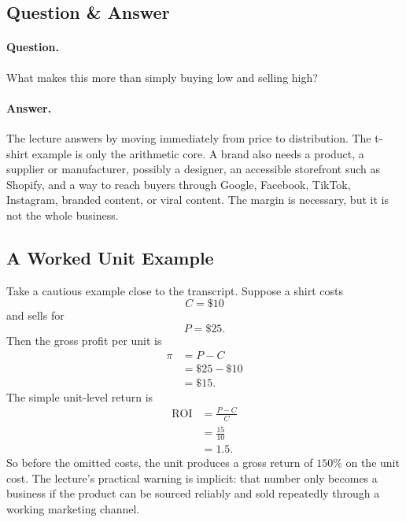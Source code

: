 \subsection{Question \& Answer}

\paragraph{Question.}
What makes this more than simply buying low and selling high?

\paragraph{Answer.}
The lecture answers by moving immediately from price to distribution. The t-shirt example is only the arithmetic core. A brand also needs a product, a supplier or manufacturer, possibly a designer, an accessible storefront such as Shopify, and a way to reach buyers through Google, Facebook, TikTok, Instagram, branded content, or viral content. The margin is necessary, but it is not the whole business.

\subsection{A Worked Unit Example}

Take a cautious example close to the transcript. Suppose a shirt costs
\[
C=\$10
\]
and sells for
\[
P=\$25.
\]
Then the gross profit per unit is
\begin{align}
\pi &= P-C\\
&= \$25-\$10\\
&= \$15.
\end{align}
The simple unit-level return is
\begin{align}
\mathrm{ROI}
&= \frac{P-C}{C}\\
&= \frac{15}{10}\\
&= 1.5.
\end{align}
So before the omitted costs, the unit produces a gross return of \(150\%\) on the unit cost. The lecture's practical warning is implicit: that number only becomes a business if the product can be sourced reliably and sold repeatedly through a working marketing channel.

